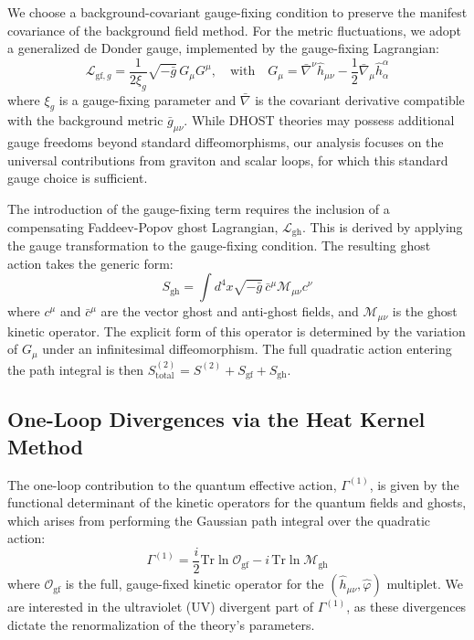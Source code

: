 \documentclass[twocolumn]{aastex631}
\begin{document}
We choose a background-covariant gauge-fixing condition to preserve the manifest covariance of the background field method. For the metric fluctuations, we adopt a generalized de Donder gauge, implemented by the gauge-fixing Lagrangian:
\begin{equation}
    \mathcal{L}_{\text{gf},g} = \frac{1}{2\xi_g} \sqrt{-\bar{g}} \, G_\mu G^\mu, \quad \text{with} \quad G_\mu = \bar{\nabla}^\nu \hat{h}_{\mu\nu} - \frac{1}{2} \bar{\nabla}_\mu \hat{h}^\alpha_\alpha
\end{equation}
where $\xi_g$ is a gauge-fixing parameter and $\bar{\nabla}$ is the covariant derivative compatible with the background metric $\bar{g}_{\mu\nu}$. While DHOST theories may possess additional gauge freedoms beyond standard diffeomorphisms, our analysis focuses on the universal contributions from graviton and scalar loops, for which this standard gauge choice is sufficient.

The introduction of the gauge-fixing term requires the inclusion of a compensating Faddeev-Popov ghost Lagrangian, $\mathcal{L}_{\text{gh}}$. This is derived by applying the gauge transformation to the gauge-fixing condition. The resulting ghost action takes the generic form:
\begin{equation}
    S_{\text{gh}} = \int d^4x \sqrt{-\bar{g}} \, \bar{c}^\mu \mathcal{M}_{\mu\nu} c^\nu
\end{equation}
where $c^\mu$ and $\bar{c}^\mu$ are the vector ghost and anti-ghost fields, and $\mathcal{M}_{\mu\nu}$ is the ghost kinetic operator. The explicit form of this operator is determined by the variation of $G_\mu$ under an infinitesimal diffeomorphism. The full quadratic action entering the path integral is then $S^{(2)}_{\text{total}} = S^{(2)} + S_{\text{gf}} + S_{\text{gh}}$.

\subsection{One-Loop Divergences via the Heat Kernel Method}

The one-loop contribution to the quantum effective action, $\Gamma^{(1)}$, is given by the functional determinant of the kinetic operators for the quantum fields and ghosts, which arises from performing the Gaussian path integral over the quadratic action:
\begin{equation}
    \Gamma^{(1)} = \frac{i}{2} \text{Tr} \ln \mathbf{\mathcal{O}}_{\text{gf}} - i \, \text{Tr} \ln \mathcal{M}_{\text{gh}}
\end{equation}
where $\mathbf{\mathcal{O}}_{\text{gf}}$ is the full, gauge-fixed kinetic operator for the $(\hat{h}_{\mu\nu}, \hat{\varphi})$ multiplet. We are interested in the ultraviolet (UV) divergent part of $\Gamma^{(1)}$, as these divergences dictate the renormalization of the theory's parameters.
\end{document}
